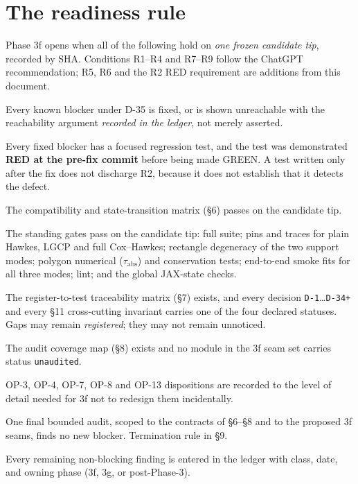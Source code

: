 \documentclass[11pt]{article}
\renewcommand{\tt}[1]{\texttt{#1}}
\newcommand{\tabs}{\ensuremath{\tau_{\mathrm{abs}}}}
\begin{document}
\section{The readiness rule}

Phase 3f opens when all of the following hold on \emph{one frozen candidate tip}, recorded
by SHA. Conditions R1--R4 and R7--R9 follow the ChatGPT recommendation; R5, R6 and the
R2 RED requirement are additions from this document.

\begin{description}[leftmargin=3.0em,style=nextline,font=\normalfont\bfseries]
  \item[R1] Every known blocker under D-35 is fixed, or is shown unreachable with the
  reachability argument \emph{recorded in the ledger}, not merely asserted.
  \item[R2] Every fixed blocker has a focused regression test, and the test was
  demonstrated \textbf{RED at the pre-fix commit} before being made GREEN. A test written
  only after the fix does not discharge R2, because it does not establish that it detects
  the defect.
  \item[R3] The compatibility and state-transition matrix (\S6) passes on the candidate
  tip.
  \item[R4] The standing gates pass on the candidate tip: full suite; pins and traces for
  plain Hawkes, LGCP and full Cox--Hawkes; rectangle degeneracy of the two support modes;
  polygon numerical (\tabs) and conservation tests; end-to-end smoke fits for all three
  modes; lint; and the global JAX-state checks.
  \item[R5] The register-to-test traceability matrix (\S7) exists, and every decision
  \tt{D-1}\dots\tt{D-34+} and every \S11 cross-cutting invariant carries one of the four
  declared statuses. Gaps may remain \emph{registered}; they may not remain unnoticed.
  \item[R6] The audit coverage map (\S8) exists and no module in the 3f seam set carries
  status \tt{unaudited}.
  \item[R7] OP-3, OP-4, OP-7, OP-8 and OP-13 dispositions are recorded to the level of
  detail needed for 3f not to redesign them incidentally.
  \item[R8] One final bounded audit, scoped to the contracts of \S6--\S8 and to the
  proposed 3f seams, finds no new blocker. Termination rule in \S9.
  \item[R9] Every remaining non-blocking finding is entered in the ledger with class, date,
  and owning phase (3f, 3g, or post-Phase-3).
\end{description}
\end{document}
